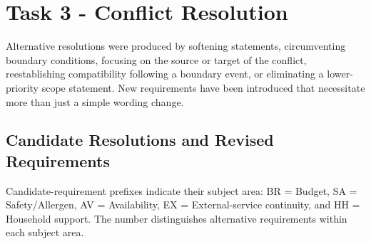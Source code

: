 \documentclass[11pt,a4paper]{article}
\begin{document}
\section{Task 3 - Conflict Resolution}

Alternative resolutions were produced by softening statements, circumventing boundary conditions, focusing on the source or target of the conflict, reestablishing compatibility following a boundary event, or eliminating a lower-priority scope statement. New requirements have been introduced that necessitate more than just a simple wording change.

\subsection{Candidate Resolutions and Revised Requirements}

Candidate-requirement prefixes indicate their subject area: BR = Budget, SA = Safety/Allergen, AV = Availability, EX = External-service continuity, and HH = Household support. The number distinguishes alternative requirements within each subject area.
\end{document}
